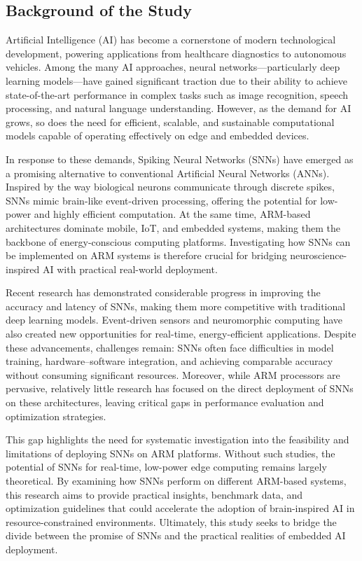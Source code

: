 \documentclass[a4paper,12pt]{article}
\begin{document}
	\subsection{Background of the Study}
	Artificial Intelligence (AI) has become a cornerstone of modern technological development, powering applications from healthcare diagnostics to autonomous vehicles. Among the many AI approaches, neural networks—particularly deep learning models—have gained significant traction due to their ability to achieve state-of-the-art performance in complex tasks such as image recognition, speech processing, and natural language understanding. However, as the demand for AI grows, so does the need for efficient, scalable, and sustainable computational models capable of operating effectively on edge and embedded devices.
	
	In response to these demands, Spiking Neural Networks (SNNs) have emerged as a promising alternative to conventional Artificial Neural Networks (ANNs). Inspired by the way biological neurons communicate through discrete spikes, SNNs mimic brain-like event-driven processing, offering the potential for low-power and highly efficient computation. At the same time, ARM-based architectures dominate mobile, IoT, and embedded systems, making them the backbone of energy-conscious computing platforms. Investigating how SNNs can be implemented on ARM systems is therefore crucial for bridging neuroscience-inspired AI with practical real-world deployment.
	
	Recent research has demonstrated considerable progress in improving the accuracy and latency of SNNs, making them more competitive with traditional deep learning models. Event-driven sensors and neuromorphic computing have also created new opportunities for real-time, energy-efficient applications. Despite these advancements, challenges remain: SNNs often face difficulties in model training, hardware–software integration, and achieving comparable accuracy without consuming significant resources. Moreover, while ARM processors are pervasive, relatively little research has focused on the direct deployment of SNNs on these architectures, leaving critical gaps in performance evaluation and optimization strategies.
	
	This gap highlights the need for systematic investigation into the feasibility and limitations of deploying SNNs on ARM platforms. Without such studies, the potential of SNNs for real-time, low-power edge computing remains largely theoretical. By examining how SNNs perform on different ARM-based systems, this research aims to provide practical insights, benchmark data, and optimization guidelines that could accelerate the adoption of brain-inspired AI in resource-constrained environments. Ultimately, this study seeks to bridge the divide between the promise of SNNs and the practical realities of embedded AI deployment.
	
\end{document}
